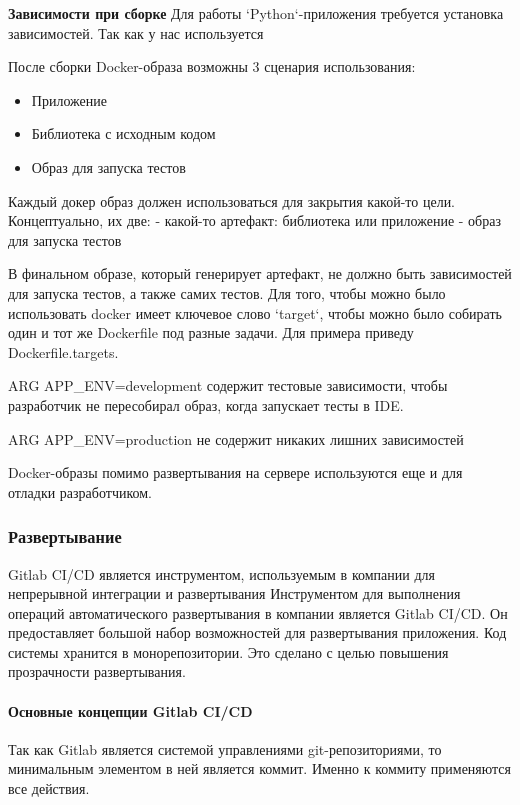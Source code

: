 \textbf{Зависимости при сборке}
Для работы `Python`-приложения требуется установка зависимостей.
Так как у нас используется

После сборки Docker-образа возможны 3 сценария использования:
\begin{itemize}
    \item Приложение
    \item Библиотека с исходным кодом
    \item Образ для запуска тестов
\end{itemize}

Каждый докер образ должен использоваться для закрытия какой-то цели. Концептуально, их две:
- какой-то артефакт: библиотека или приложение
- образ для запуска тестов

В финальном образе, который генерирует артефакт, не должно быть зависимостей для запуска тестов,
а также самих тестов.
Для того, чтобы можно было использовать docker имеет ключевое слово `target`, чтобы можно было собирать один
и тот же Dockerfile под разные задачи. Для примера приведу Dockerfile.targets.

ARG APP\_ENV=development содержит тестовые зависимости, чтобы разработчик не пересобирал образ, когда запускает тесты
в IDE.

ARG APP\_ENV=production не содержит никаких лишних зависимостей

Docker-образы помимо развертывания на сервере используются еще и для отладки разработчиком.



\subsubsection{{Развертывание}}

Gitlab CI/CD является инструментом, используемым в компании для непрерывной интеграции и развертывания
Инструментом для выполнения операций автоматического развертывания в компании является Gitlab CI/CD.
Он предоставляет большой набор возможностей для развертывания приложения.
Код системы хранится в монорепозитории.
Это сделано с целью повышения прозрачности развертывания.


\paragraph{Основные концепции Gitlab CI/CD}

Так как Gitlab является системой управлениями git-репозиториями, то минимальным элементом в ней является коммит.
Именно к коммиту применяются все действия.



